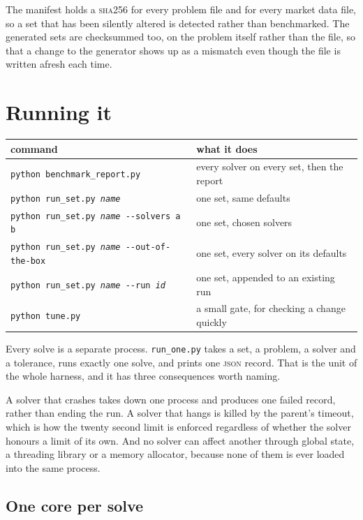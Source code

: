 \documentclass[a4paper,11pt]{book}
\theoremstyle{plain}
\theoremstyle{definition}
\theoremstyle{remark}
\numberwithin{equation}{chapter}
\numberwithin{algorithm}{chapter}
\begin{document}
	The manifest holds a \textsc{sha256} for every problem file and for every
	market data file, so a set that has been silently altered is detected rather
	than benchmarked. The generated sets are checksummed too, on the problem
	itself rather than the file, so that a change to the generator shows up as a
	mismatch even though the file is written afresh each time.

	\section{Running it}

	\begin{table}[H]
		\centering\small
		\begin{tabular}{ll}
			\toprule
			command & what it does\\
			\midrule
			\texttt{python benchmark\_report.py} & every solver on every set, then
			the report\\
			\texttt{python run\_set.py \textit{name}} & one set, same defaults\\
			\texttt{python run\_set.py \textit{name} -{}-solvers a b}
			& one set, chosen solvers\\
			\texttt{python run\_set.py \textit{name} -{}-out-of-the-box}
			& one set, every solver on its defaults\\
			\texttt{python run\_set.py \textit{name} -{}-run \textit{id}}
			& one set, appended to an existing run\\
			\texttt{python tune.py} & a small gate, for checking a change quickly\\
			\bottomrule
		\end{tabular}
	\end{table}

	Every solve is a separate process. \texttt{run\_one.py} takes a set, a
	problem, a solver and a tolerance, runs exactly one solve, and prints one
	\textsc{json} record. That is the unit of the whole harness, and it has three
	consequences worth naming.

	A solver that crashes takes down one process and produces one failed record,
	rather than ending the run. A solver that hangs is killed by the parent's
	timeout, which is how the twenty second limit is enforced regardless of
	whether the solver honours a limit of its own. And no solver can affect
	another through global state, a threading library or a memory allocator,
	because none of them is ever loaded into the same process.

	\subsection{One core per solve}
\end{document}
